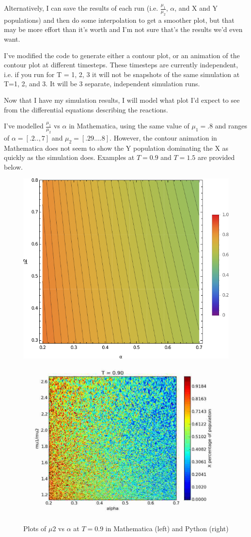 \documentclass[oneside]{labbook}
\begin{document}
Alternatively, I can save the results of each run
(i.e. $\frac{\mu_1}{\mu_2}$, $\alpha$, and X and Y populations) and then do some
interpolation to get a smoother plot, but that may be more effort than it's worth
and I'm not sure that's the results we'd even want.

I've modified the code to generate either a contour plot, or an animation of the
contour plot at different timesteps. These timesteps are currently independent,
i.e. if you run for T = 1, 2, 3  it will not be snapshots of the same simulation
at T=1, 2, and 3. It will be 3 separate, independent simulation runs.

Now that I have my simulation results, I will model what plot I'd expect to see
from the differential equations describing the reactions.

I've modelled $\frac{\mu_1}{\mu_2}$ vs $\alpha$ in Mathematica, using the same
value of $\mu_1 = .8$ and ranges of $\alpha = [.2 .. ,7]$ and $\mu_2 = [.29 ... .8]$.
However, the contour animation in Mathematica does not seem to show the Y population
dominating the X as quickly as the simulation does. Examples at $T=0.9$ and
$T=1.5$ are provided below.


\begin{figure}[h!]
\includegraphics[width=.5\columnwidth]{mathematica_T0_9.pdf}
\includegraphics[width=.5\columnwidth]{python_T0_9.pdf}
\caption{Plots of $\mu2$ vs $\alpha$ at $T=0.9$ in Mathematica (left) and Python (right)}
\end{figure}
\end{document}
